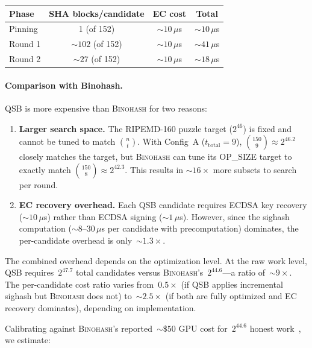 \documentclass[11pt, a4paper]{article}
\begin{document}
\begin{center}
\small
\begin{tabular}{lccc}
\toprule
\textbf{Phase} & \textbf{SHA blocks/candidate} & \textbf{EC cost} & \textbf{Total} \\
\midrule
Pinning & 1 (of 152) & ${\sim}10\,\mu$s & ${\sim}10\,\mu$s \\
Round 1 & ${\sim}102$ (of 152) & ${\sim}10\,\mu$s & ${\sim}41\,\mu$s \\
Round 2 & ${\sim}27$ (of 152) & ${\sim}10\,\mu$s & ${\sim}18\,\mu$s \\
\bottomrule
\end{tabular}
\end{center}

\paragraph{Comparison with Binohash.}
QSB is more expensive than \textsc{Binohash} for two reasons:

\begin{enumerate}
    \item \textbf{Larger search space.} The RIPEMD-160 puzzle target ($2^{46}$) is fixed and cannot be tuned to match $\binom{n}{t}$. With Config~A ($t_{\mathrm{total}} = 9$), $\binom{150}{9} \approx 2^{46.2}$ closely matches the target, but \textsc{Binohash} can tune its OP\_SIZE target to exactly match $\binom{150}{8} \approx 2^{42.3}$. This results in ${\sim}16\times$ more subsets to search per round.

    \item \textbf{EC recovery overhead.} Each QSB candidate requires ECDSA key recovery (${\sim}10\,\mu$s) rather than ECDSA signing (${\sim}1\,\mu$s). However, since the sighash computation (${\sim}8$--$30\,\mu$s per candidate with precomputation) dominates, the per-candidate overhead is only~${\sim}1.3\times$.
\end{enumerate}

\noindent The combined overhead depends on the optimization level. At the raw work level, QSB requires~$2^{47.7}$ total candidates versus \textsc{Binohash}'s~$2^{44.6}$---a ratio of~${\sim}9\times$. The per-candidate cost ratio varies from~$0.5\times$ (if QSB applies incremental sighash but \textsc{Binohash} does not) to~${\sim}2.5\times$ (if both are fully optimized and EC recovery dominates), depending on implementation.

Calibrating against \textsc{Binohash}'s reported~${\sim}\$50$ GPU cost for~$2^{44.6}$ honest work~\cite{linus2024binohash}, we estimate:
\end{document}
